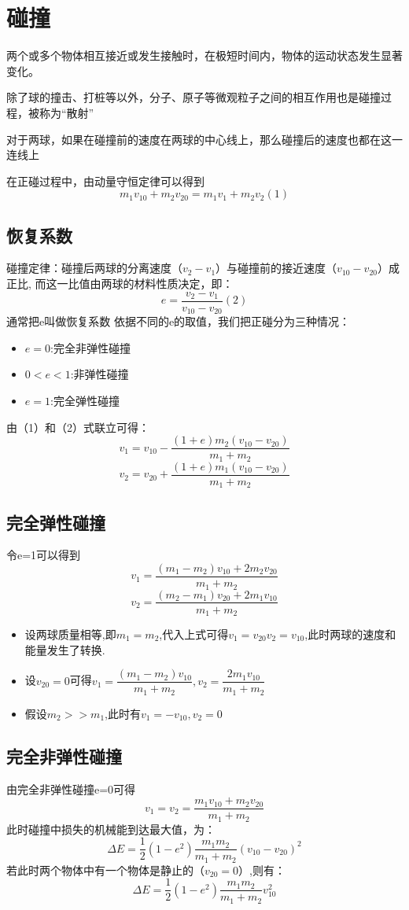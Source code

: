 \section{碰撞}
\begin{definition}[碰撞]
	两个或多个物体相互接近或发生接触时，在极短时间内，物体的运动状态发生显著变化。\
\end{definition}
除了球的撞击、打桩等以外，分子、原子等微观粒子之间的相互作用也是碰撞过程，被称为“散射”

\begin{definition}[正碰]
	对于两球，如果在碰撞前的速度在两球的中心线上，那么碰撞后的速度也都在这一连线上\
\end{definition}
在正碰过程中，由动量守恒定律可以得到$$
m_1v_{10}+m_2v_{20}=m_1v_1+m_2v_2   (1)
$$
\subsection{恢复系数}
碰撞定律：碰撞后两球的分离速度（$v_2-v_1$）与碰撞前的接近速度（$v_{10}-v_{20}$）成正比,
而这一比值由两球的材料性质决定，即：
$$
e=\dfrac{v_2-v_1}{v_{10}-v_{20}}   (2)
$$
通常把e叫做恢复系数
依据不同的e的取值，我们把正碰分为三种情况：
\begin{itemize}
    \item $e=0$:完全非弹性碰撞
    \item $0<e<1$:非弹性碰撞
    \item $e=1$:完全弹性碰撞
    
\end{itemize}
由（1）和（2）式联立可得：
$$
v_1=v_{10}-\dfrac{(1+e)m_2(v_{10}-v_{20})}{m_1+m_2}
$$
$$
v_2=v_{20}+\dfrac{(1+e)m_1(v_{10}-v_{20})}{m_1+m_2}
$$
\subsection{完全弹性碰撞}
令e=1可以得到
$$
v_1=\dfrac{(m_1-m_2)v_{10}+2m_2v_{20}}{m_1+m_2}
$$
$$
v_2=\dfrac{(m_2-m_1)v_{20}+2m_1v_{10}}{m_1+m_2}
$$
\begin{itemize}
    \item 设两球质量相等,即$m_1=m_2$,代入上式可得$v_1=v_{20} v_2=v_{10}$,此时两球的速度和能量发生了转换.

    \item 设$v_{20}=0$可得$v_1=\dfrac{(m_1-m_2)v_{10}}{m_1+m_2} , v_2=\dfrac{2m_1v_{10}}{m_1+m_2}$
    \item 假设$m_2>>m_1$,此时有$v_1=-v_{10},v_2=0$
\end{itemize}
\subsection{完全非弹性碰撞}
由完全非弹性碰撞e=0可得
$$
v_1=v_2=\dfrac{m_1v_{10}+m_2v_{20}}{m_1+m_2}
$$
此时碰撞中损失的机械能到达最大值，为：
$$
\Delta E=\dfrac{1}{2}(1-e^2)\dfrac{m_1m_2}{m_1+m_2}(v_{10}-v_{20})^2
$$
若此时两个物体中有一个物体是静止的（$v_{20}=0$）,则有：
$$
\Delta E=\dfrac{1}{2}(1-e^2)\dfrac{m_1m_2}{m_1+m_2}v_{10}^2
$$